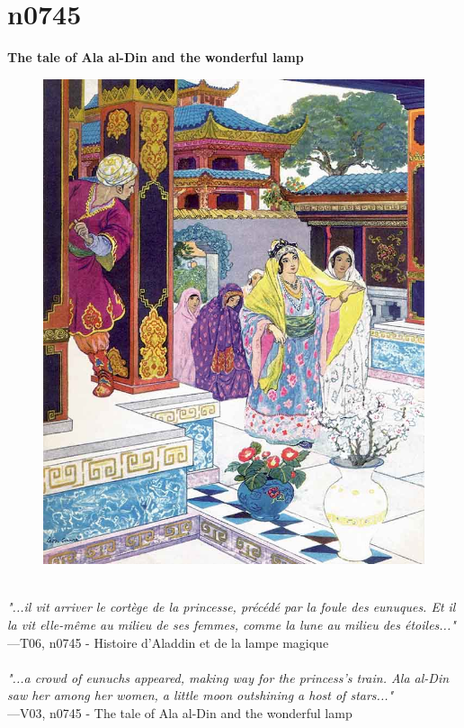 \documentclass[../Carre_nights.tex]{subfiles}
\begin{document}
\newpage

\section{n0745}
\textbf{\Large{The tale of Ala al-Din and the wonderful lamp}} \\

\begin{figure}[ht]
\centering
\includegraphics[height=\figsize]{illustrations/volume_6/T06, n0745 - Histoire d'Aladdin et de la lampe magique.jpg}
\end{figure}

\textit{\\
"...il vit arriver le cortège de la princesse, précédé par la foule des eunuques. Et il la vit elle-même au milieu de ses femmes, comme la lune au milieu des étoiles..."} \\
—T06, n0745 - Histoire d'Aladdin et de la lampe magique \\~\\
\textit{"...a crowd of eunuchs appeared, making way for the princess's train. Ala al-Din saw her among her women, a little moon outshining a host of stars..."} \\
—V03, n0745 - The tale of Ala al-Din and the wonderful lamp
\end{document}
